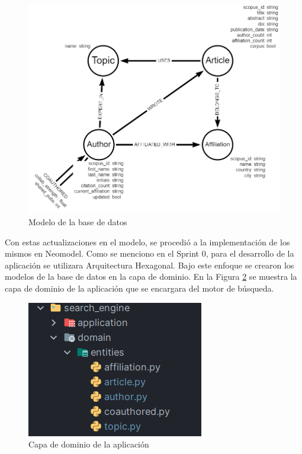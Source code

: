 \begin{figure}[H]
    \centering
    \includegraphics[scale=0.5]{../02Figures/02Chapter/Sprints/Sprint-3/centinela-graph.design-light.png}
    \caption{Modelo de la base de datos }
    \label{fig:neo4j-model}
\end{figure}

Con estas actualizaciones en el modelo, se procedió a la implementación de los mismos en Neomodel.
Como se menciono en el Sprint 0, para el desarrollo de la aplicación
se utilizara Arquitectura Hexagonal. Bajo este enfoque se crearon los modelos de la base de datos en la capa de dominio.
En la Figura \ref{fig:domain-layer} se muestra la capa de dominio de la aplicación que se encargara del motor de búsqueda.

\begin{figure}[H]
    \centering
    \includegraphics[scale=0.9]{../02Figures/02Chapter/Sprints/Sprint-3/domain-layer.png}
    \caption{Capa de dominio de la aplicación}
    \label{fig:domain-layer}
\end{figure}

